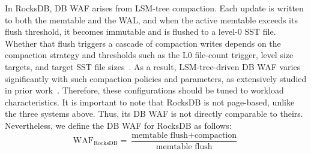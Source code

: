 In RocksDB, DB WAF arises from LSM-tree compaction.
Each update is written to both the memtable and the WAL, and when the active memtable exceeds its flush threshold, it becomes immutable and is flushed to a level-0 SST file. 
Whether that flush triggers a cascade of compaction writes depends on the compaction strategy and thresholds such as the L0 file-count trigger, level size targets, and target SST file sizes~\cite{rocksdb_db_bench}.
As a result, LSM-tree-driven DB WAF varies significantly with such compaction policies and parameters, as extensively studied in prior work~\cite{LSMTreeCost_SIGMOD2024, Dayan_TODS2018, Liu2025_ArceKV, lsmdesign, Dayan_VLDB2022_Hybrid}.
Therefore, these configurations should be tuned to workload characteristics. 
It is important to note that RocksDB is not page-based, unlike the three systems above.
Thus, its DB WAF is not directly comparable to theirs.
Nevertheless, we define the DB WAF for RocksDB as follows:
\[
\text{WAF}_{\text{RocksDB}} =
\frac{\text{memtable flush} + \text{compaction}}
     {\text{memtable flush}}
\]
